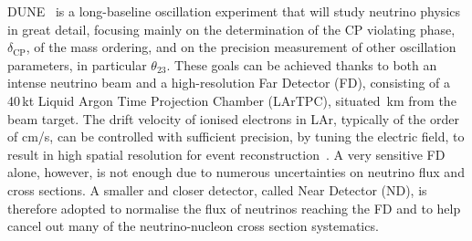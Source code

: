 DUNE~\cite{Abi:2018dnh} is a long-baseline oscillation experiment that will study neutrino physics in great detail, %
focusing mainly on the determination of the CP violating phase, $\delta_\text{CP}$, %
of the mass ordering, %
and on the precision measurement of other oscillation parameters, in particular $\theta_{23}$.
These goals can be achieved thanks to both an intense neutrino beam and a high-resolution Far Detector (FD), %
consisting of a 40\,kt Liquid Argon Time Projection Chamber (LArTPC), situated \,km from the beam target.
The drift velocity of ionised electrons in LAr, typically of the order of cm/\textmu s, %
can be controlled with sufficient precision, by tuning the electric field, %
to result in high spatial resolution for event reconstruction~\cite{Rubbia:1977zz}.
A very sensitive FD alone, however, is not enough due to numerous uncertainties on neutrino flux and cross sections.
A smaller and closer detector, called Near Detector (ND), is therefore adopted to normalise the flux of neutrinos reaching the FD and to help cancel out many of %
the neutrino-nucleon cross section systematics.

